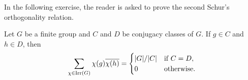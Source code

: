 In the following exercise, the reader is asked to prove the second 
Schur's orthogonality relation. 

\begin{exercise}
    Let $G$ be a finite group and 
    $C$ and $D$ be conjugacy classes of $G$. If $g\in C$ and $h\in D$, then
    \[
    \sum_{\chi\in\operatorname{Irr}(G)}\chi(g)\overline{\chi(h)}=
    \begin{cases}
    |G|/|C| & \text{if $C=D$},\\
    0 & \text{otherwise}.
    \end{cases}
    \]
\end{exercise}
